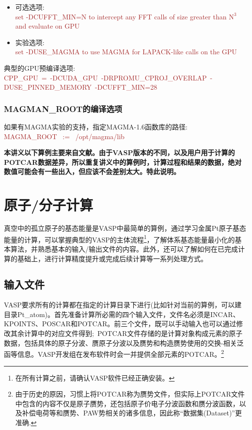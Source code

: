 \begin{itemize}
\begin{itemize}
			\item 可选选项:\\
				\textcolor{brown}{\textrm{set -DCUFFT\_MIN=N to intercept any FFT calls of size greater than $\mathrm{N}^3$ and evaluate on GPU}}
			\item 实验选项:\\
				\textcolor{brown}{\textrm{set -DUSE\_MAGMA to use MAGMA for LAPACK-like calls on the GPU}}
		\end{itemize}
		典型的\textrm{GPU}预编译选项:\\
		\textcolor{brown}{\textrm{CPP\_GPU~=~-DCUDA\_GPU~-DRPROMU\_CPROJ\_OVERLAP~-DUSE\_PINNED\_MEMORY~-DCUFFT\_MIN=28}}
\end{itemize}
\subsubsection{\rm{MAGMAN\_ROOT}的编译选项}
如果有\textrm{MAGMA}实验的支持，指定\textrm{MAGMA-1.6}函数库的路径:\\
\textcolor{brown}{\textrm{MAGMA\_ROOT~ :=~ /opt/magma/lib }}


\newpage
\textbf{本讲义以下算例主要来自文献。由于\textrm{VASP}版本的不同，以及用户用于计算的\textrm{POTCAR}数据差异，所以重复讲义中的算例时，计算过程和结果的数据，绝对数值可能会有一些出入，但应该不会差别太大。特此说明。}

\section{原子/分子计算}\label{Sec:atom-Pt}
真空中的孤立原子的基态能量是\textrm{VASP}中最简单的算例，通过学习金属\textrm{Pt}原子基态能量的计算，可以掌握典型的\textrm{VASP}的主体流程\footnote{在所有计算之前，请确认\textrm{VASP}软件已经正确安装。}，了解体系基态能量最小化的基本算法，并熟悉基本的输入/输出文件的内容。此外，还可以了解如何在已完成计算的基础上，进行计算精度提升或完成后续计算等一系列处理方式。
\subsection{输入文件}
\textrm{VASP}要求所有的计算都在指定的计算目录下进行(比如针对当前的算例，可以建目录\textrm{Pt\_atom})。首先准备计算所必需的四个输入文件，文件名必须是\textrm{INCAR}、\textrm{KPOINTS}、\textrm{POSCAR}和\textrm{POTCAR}。前三个文件，既可以手动输入也可以通过修改其余计算中的对应文件得到;~\textrm{POTCAR}文件存储的是计算对象构成元素的原子数据，包括具体的原子分波、赝原子分波以及赝势和构造赝势使用的交换-相关泛函等信息。\textrm{VASP}开发组在发布软件时会一并提供全部元素的\textrm{POTCAR}。\footnote{由于历史的原因，习惯上将\textrm{POTCAR}称为赝势文件，但实际上\textrm{POTCAR}文件中包含的内容不仅是原子赝势，还包括原子价电子分波函数和赝分波函数，以及补偿电荷等和赝势、\textrm{PAW}势相关的诸多信息，因此称“数据集(\textrm{Dataset})”更准确.}
